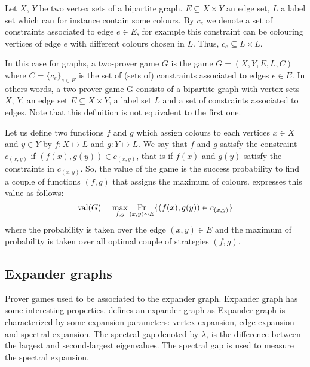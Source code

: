 Let $X$, $Y$ be two vertex sets of a bipartite graph. $E\subseteq X \times Y$ an edge set, $L$ a label set which can for instance contain some colours. By $c_e$ we denote a set of constraints associated to edge $e \in E$, for example  this constraint can be colouring vertices of edge $e$ with different colours chosen in $L$. Thus, $c_e \subseteq L \times L$.

In this case for graphs, a two-prover game $G$ is the game $G=(X,Y,E,L,C)$ where $C=\{c_e\}_{e\in E}$ is the set of (sets of) constraints associated to edges $e \in E$.
In others words, a two-prover game G consists of a bipartite graph with vertex
sets $X$, $Y$, an edge set $ E \subseteq X \times Y$, a label set $L$ and a set of constraints associated to edges. Note that this definition is not equivalent to the first one.


Let us define two functions $f$ and $g$ which assign colours to each vertices  $x \in X$ and $y \in Y$ by $f: X\longmapsto L$ and $g: Y\longmapsto L$. We say that $f$ and $g$ satisfy the constraint $c_{(x,y)}$ if $(f(x),g(y)) \in c_{(x,y)}$, that is if $f(x)$ and $g(y)$ satisfy the constraints in $c_{(x,y)}$. So, the value of the game is the success probability to find a couple of functions $(f,g)$ that assigns the maximum of colours.
\cite{tamaki2015parallel} expresses this value as follows: 
 $$\mathrm{val} (G)=\max_{f,g}\underset{(x,y)\sim E}\Pr  \{(f(x),g(y)) \in c_{(x,y)} \}$$
where the probability is taken over the edge $(x,y) \in E$ and the maximum of probability is taken over all optimal couple of strategies $(f,g).$

\subsection{Expander graphs}

Prover games used to be associated to the expander graph. Expander graph has some interesting properties. 
\cite{nielsen2005introduction} defines an expander graph as  Expander graph is characterized by some expansion parameters: vertex expansion, edge expansion and spectral expansion. The spectral gap denoted by $\lambda$, is the difference between the largest and second-largest eigenvalues. The spectral gap is used to measure the spectral expansion. 

